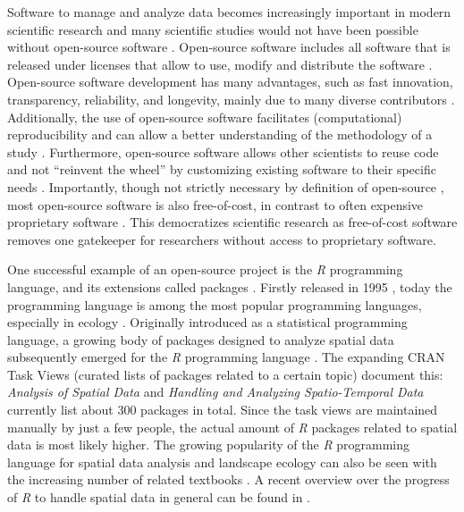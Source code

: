 \documentclass[smallextended]{svjour3}       %
\begin{document}
Software to manage and analyze data becomes increasingly important in modern scientific research \cite{Wilson2014} and many scientific studies would not have been possible without open-source software \cite{Prlic2012}.
Open-source software includes all software that is released under licenses that allow to use, modify and distribute the software \cite{St.Laurent2008}.
Open-source software development has many advantages, such as fast innovation, transparency, reliability, and longevity, mainly due to many diverse contributors \cite{vonKrogh2006,St.Laurent2008}.
Additionally, the use of open-source software facilitates (computational) reproducibility and can allow a better understanding of the methodology of a study \cite{Prlic2012,Powers2019}.
Furthermore, open-source software allows other scientists to reuse code and not ``reinvent the wheel'' \cite{Prlic2012} by customizing existing software to their specific needs \cite{Steiniger2009}.
Importantly, though not strictly necessary by definition of open-source \cite{Steiniger2009,Steiniger2009a}, most open-source software is also free-of-cost, in contrast to often expensive proprietary software \cite{vonKrogh2006,Steiniger2009,Steiniger2009a}.
This democratizes scientific research as free-of-cost software removes one gatekeeper for researchers without access to proprietary software.

One successful example of an open-source project is the \emph{R} programming language, and its extensions called packages \cite{RCoreTeam2019}.
Firstly released in 1995 \cite{Smith2016}, today the programming language is among the most popular programming languages, especially in ecology \cite{Lai2019}.
Originally introduced as a statistical programming language, a growing body of packages designed to analyze spatial data subsequently emerged for the \emph{R} programming language \cite{Bivand2006,Lovelace2019}.
The expanding CRAN Task Views (curated lists of packages related to a certain topic) document this: \emph{Analysis of Spatial Data} \cite{Bivand2019a} and \emph{Handling and Analyzing Spatio-Temporal Data} \cite{Pebesma2020} currently list about 300 packages in total.
Since the task views are maintained manually by just a few people, the actual amount of \emph{R} packages related to spatial data is most likely higher.
The growing popularity of the \emph{R} programming language for spatial data analysis and landscape ecology can also be seen with the increasing number of related textbooks \cite{Wegmann2016,Fletcher2019,Lovelace2019,Pebesma2019a}.
A recent overview over the progress of \emph{R} to handle spatial data in general can be found in \cite{Bivand2020}.
\end{document}
